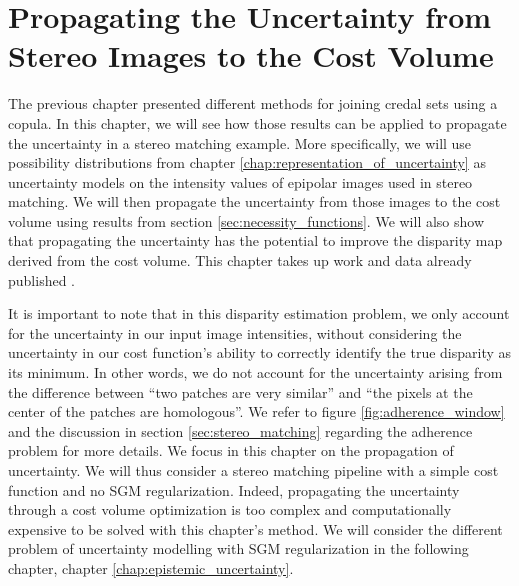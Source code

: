 \chapter{Propagating the Uncertainty from Stereo Images to the Cost Volume}\label{chap:propagating}
The previous chapter presented different methods for joining credal sets using a copula. In this chapter, we will see how those results can be applied to propagate the uncertainty in a stereo matching example. More specifically, we will use possibility distributions from chapter \ref{chap:representation_of_uncertainty} as uncertainty models on the intensity values of epipolar images used in stereo matching. We will then propagate the uncertainty from those images to the cost volume using results from section \ref{sec:necessity_functions}. We will also show that propagating the uncertainty has the potential to improve the disparity map derived from the cost volume. This chapter takes up work and data already published \cite{malinowski_copulas_2022, malinowski_uncertainty_2023}.

It is important to note that in this disparity estimation problem, we only account for the uncertainty in our input image intensities, without considering the uncertainty in our cost function's ability to correctly identify the true disparity as its minimum. In other words, we do not account for the uncertainty arising from the difference between ``two patches are very similar'' and ``the pixels at the center of the patches are homologous''. We refer to figure \ref{fig:adherence_window} and the discussion in section \ref{sec:stereo_matching} regarding the adherence problem for more details. We focus in this chapter on the propagation of uncertainty. We will thus consider a stereo matching pipeline with a simple cost function and no SGM regularization. Indeed, propagating the uncertainty through a cost volume optimization is too complex and computationally expensive to be solved with this chapter's method. We will consider the different problem of uncertainty modelling with SGM regularization in the following chapter, chapter \ref{chap:epistemic_uncertainty}. 

